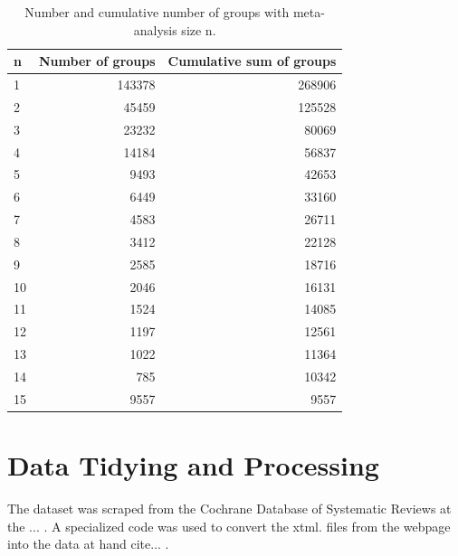 \documentclass[11pt,a4paper,twoside]{book}\usepackage[]{graphicx}\usepackage[]{color}
\makeatletter
\newenvironment{kframe}{%
 \def\at@end@of@kframe{}%
 \ifinner\ifhmode%
  \def\at@end@of@kframe{\end{minipage}}%
  \begin{minipage}{\columnwidth}%
 \fi\fi%
 \def\FrameCommand##1{\hskip\@totalleftmargin \hskip-\fboxsep
 \colorbox{shadecolor}{##1}\hskip-\fboxsep
     \hskip-\linewidth \hskip-\@totalleftmargin \hskip\columnwidth}%
 \MakeFramed {\advance\hsize-\width
   \@totalleftmargin\z@ \linewidth\hsize
   \@setminipage}}%
 {\par\unskip\endMakeFramed%
 \at@end@of@kframe}
\makeatother
\begin{document}
\begin{kframe}


{\ttfamily\noindent\color{warningcolor}{\#\# Warning: Setting row names on a tibble is deprecated.}}\end{kframe}%
\begin{table}[ht]
\centering
\begingroup\footnotesize
\begin{tabular}{lrr}
  \hline
n & Number of groups & Cumulative sum of groups \\ 
  \hline
1 & 143378 & 268906 \\ 
  2 & 45459 & 125528 \\ 
  3 & 23232 & 80069 \\ 
  4 & 14184 & 56837 \\ 
  5 & 9493 & 42653 \\ 
  6 & 6449 & 33160 \\ 
  7 & 4583 & 26711 \\ 
  8 & 3412 & 22128 \\ 
  9 & 2585 & 18716 \\ 
  10 & 2046 & 16131 \\ 
  11 & 1524 & 14085 \\ 
  12 & 1197 & 12561 \\ 
  13 & 1022 & 11364 \\ 
  14 & 785 & 10342 \\ 
  15 & 9557 & 9557 \\ 
   \hline
\end{tabular}
\endgroup
\caption{Number and cumulative number of groups with meta-analysis size n.} 
\label{repr.groups}
\end{table}


\section{Data Tidying and Processing} \label{sec:Processing}
The dataset was scraped from the Cochrane Database of Systematic Reviews at the ... . A specialized code was used to convert the xtml. files from the webpage into the data at hand cite... . 
\end{document}
